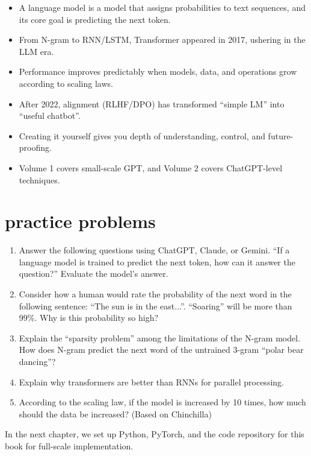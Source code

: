 \begin{itemize}
\item A language model is a model that assigns probabilities to text sequences, and its core goal is predicting the next token.
\item From N-gram to RNN/LSTM, Transformer appeared in 2017, ushering in the LLM era.
\item Performance improves predictably when models, data, and operations grow according to scaling laws.
\item After 2022, alignment (RLHF/DPO) has transformed ``simple LM'' into ``useful chatbot''.
\item Creating it yourself gives you depth of understanding, control, and future-proofing.
\item Volume 1 covers small-scale GPT, and Volume 2 covers ChatGPT-level techniques.
\end{itemize}

\section{practice problems}

\begin{enumerate}
\item Answer the following questions using ChatGPT, Claude, or Gemini. ``If a language model is trained to predict the next token, how can it answer the question?'' Evaluate the model's answer.
\item Consider how a human would rate the probability of the next word in the following sentence: ``The sun is in the east...''. ``Soaring'' will be more than 99\%. Why is this probability so high?
\item Explain the ``sparsity problem'' among the limitations of the N-gram model. How does N-gram predict the next word of the untrained 3-gram ``polar bear dancing''?
\item Explain why transformers are better than RNNs for parallel processing.
\item According to the scaling law, if the model is increased by 10 times, how much should the data be increased? (Based on Chinchilla)
\end{enumerate}

In the next chapter, we set up Python, PyTorch, and the code repository for this book for full-scale implementation.
